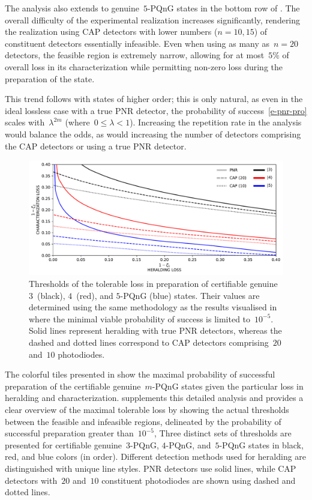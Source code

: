 \documentclass{optica-article}
\begin{document}
The analysis also extends to genuine~$5$-PQnG states in the {bottom} row of . The overall difficulty of the experimental realization increases significantly, rendering the realization using CAP detectors with lower numbers (${n = 10, 15}$) of constituent detectors essentially infeasible. Even when using as many as~${n = 20}$ detectors, the feasible region is extremely narrow, allowing for at most~$5\%$ of overall loss in its characterization while permitting non-zero loss during the preparation of the state.

This trend follows with states of higher order; this is only natural, as even in the ideal lossless case with a true PNR detector, the probability of success~\eqref{e-pnr-pro} scales with~${\lambda^{2m}}$ (where~${0 \leq \lambda < 1}$). Increasing the repetition rate in the analysis would balance the odds, as would increasing the number of detectors comprising the CAP detectors or using a true PNR detector.

\begin{figure}[h]
  \begin{center}
    \includegraphics[width = \columnwidth]{import/202504/curves_unified_03_04_05_10dB-1001.pdf}
  \end{center}
  \caption{
    Thresholds of the tolerable loss in preparation of certifiable genuine $3$~(black), $4$~(red), and $5$-PQnG (blue) states. Their values are determined using the same methodology as the results visualised in  where the minimal viable probability of success is limited to~$10^{-5}$. Solid lines represent heralding with true PNR detectors, whereas the dashed and dotted lines correspond to CAP detectors comprising~$20$ and~$10$ photodiodes.
  }
  \label{f-thr-345}
\end{figure}

The colorful tiles presented in  show the maximal probability of successful preparation of the certifiable genuine~$m$-PQnG states given the particular loss in heralding and characterization.  supplements this detailed analysis and provides a clear overview of the maximal tolerable loss by showing the actual thresholds between the feasible and infeasible regions, delineated by the probability of successful preparation greater than~$10^{-5}$, 
%
Three distinct sets of thresholds are presented for certifiable genuine~$3$-PQnG, $4$-PQnG, and~$5$-PQnG states in black, red, and blue colors (in order). Different detection methods used for heralding are distinguished with unique line styles. PNR detectors use solid lines, while CAP detectors with~$20$ and~$10$ constituent photodiodes are shown using dashed and dotted lines.
\end{document}
